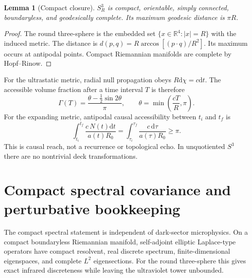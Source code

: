 \documentclass[
  aps,
  prd,
  reprint,
  superscriptaddress,
  nofootinbib,
  floatfix,
  longbibliography
]{revtex4-2}
\theoremstyle{plain}
\newtheorem{lemma}[theorem]{Lemma}
\theoremstyle{definition}
\theoremstyle{remark}
\newcommand{\dd}{\mathrm d}
\newcommand{\RR}{\mathbb R}
\begin{document}
\begin{lemma}[Compact closure]
$S^3_R$ is compact, orientable, simply connected, boundaryless, and
geodesically complete.  Its maximum geodesic distance is $\pi R$.
\end{lemma}

\begin{proof}
The round three-sphere is the embedded set
$\{x\in\RR^4:|x|=R\}$ with the induced metric.  The distance is
$d(p,q)=R\arccos[(p\cdot q)/R^2]$.  Its maximum occurs at antipodal points.
Compact Riemannian manifolds are complete by Hopf--Rinow.
\end{proof}

For the ultrastatic metric, radial null propagation obeys $R\dd\chi=c\dd t$.
The accessible volume fraction after a time interval $T$ is therefore
\begin{equation}
\Gamma(T)=\frac{\theta-\frac12\sin2\theta}{\pi},\qquad
\theta=\min\left(\frac{cT}{R},\pi\right).
\label{eq:access}
\end{equation}
For the expanding metric, antipodal causal accessibility between $t_i$ and
$t_f$ is
\begin{equation}
\int_{t_i}^{t_f}\frac{c\,N(t)\dd t}{a(t)R_0}
=\int_{\tau_i}^{\tau_f}\frac{c\,\dd\tau}{a(\tau)R_0}\ge\pi .
\label{eq:conformal_access}
\end{equation}
This is causal reach, not a recurrence or topological echo.  In unquotiented
$S^3$ there are no nontrivial deck transformations.

\section{Compact spectral covariance and perturbative bookkeeping}
\label{sec:compact_spectral_covariance}

The compact spectral statement is independent of dark-sector microphysics.  On
a compact boundaryless Riemannian manifold, self-adjoint elliptic Laplace-type
operators have compact resolvent, real discrete spectrum, finite-dimensional
eigenspaces, and complete $L^2$ eigensections.  For the round three-sphere this
gives exact infrared discreteness while leaving the ultraviolet tower unbounded.
\end{document}
